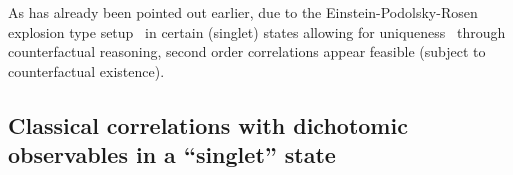 \documentclass[%
  twocolumn,
 showpacs,
 showkeys,
 preprintnumbers,
 amsmath,amssymb,
 aps,
  pra,
  longbibliography,
 floatfix,
 ]{revtex4-1}
\begin{document}



As has already been pointed out earlier, due to the Einstein-Podolsky-Rosen explosion type setup~\cite{epr}
in certain (singlet) states allowing for uniqueness~\cite{svozil-2006-uniquenessprinciple,svozil:040102,schimpf-svozil}
through counterfactual reasoning,
second order correlations appear feasible (subject to counterfactual existence).

\subsection{Classical correlations with dichotomic observables in a ``singlet'' state}
\label{2017-b-ch-appe-cts-class}
\end{document}
